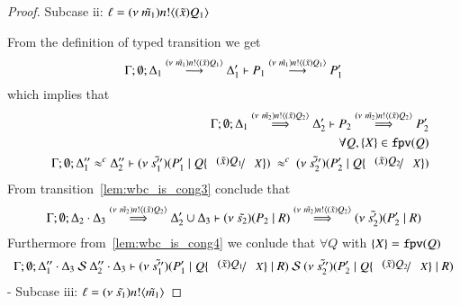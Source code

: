 \begin{proof}
	\noi Subcase ii: $\ell = (\nu\ \tilde{m_1}) n ! \langle (\tilde{x})Q_1 \rangle$

	\noi From the definition of typed transition we get
	\[
		\Gamma; \emptyset; \Delta_1 \stackrel{(\nu\ \tilde{m_1}) n ! \langle (\tilde{x})Q_1 \rangle}{\longrightarrow} \Delta_1' \vdash P_1 \stackrel{(\nu\ \tilde{m_1}) n ! \langle (\tilde{x})Q_1 \rangle}{\longrightarrow} P_1'
	\]
	\noi which implies that
%
	\begin{eqnarray}
		&&\Gamma; \emptyset; \Delta_1 \By{\news{\tilde{m_2}} \bactout{n}{\abs{\tilde{x}}{Q_2}}} \Delta_2' \proves P_2 \By{\news{\tilde{m_2}} \bactout{n}{\abs{\tilde{x}}{Q_2}}} P_2' \label{lem:wbc_is_cong3} \\
		&&\forall Q, \set{X} \in \fpv{Q} \nonumber \\
		&&\Gamma; \emptyset; \Delta_1'' \wbc \Delta_2'' \proves \newsp{\tilde{s_1''}}{P_1' \Par Q \subst{(\tilde{x}) Q_1}{X}}\ \wbc\ \newsp{\tilde{s_2''}}{P_2' \Par Q \subst{(\tilde{x}) Q_2}{X}} \label{lem:wbc_is_cong4}
	\end{eqnarray}
%
	\noi From transition~\ref{lem:wbc_is_cong3} conclude that 
	\[
		\Gamma;\emptyset; \Delta_2 \cdot \Delta_3 \stackrel{(\nu\ \tilde{m_2}) n ! \langle (\tilde{x})Q_2 \rangle}{\Longrightarrow} \Delta_2' \cup \Delta_3 \vdash (\nu\ \tilde{s_2})(P_2 \;|\; R) \stackrel{(\nu\ \tilde{m_2}) n ! \langle (\tilde{x})Q_2 \rangle}{\Longrightarrow} (\nu\ \tilde{s_2'})(P_2' \;|\; R)
	\]
%
	\noi Furthermore from~\ref{lem:wbc_is_cong4} we conlude that $\forall Q$ with $\{X\} = \mathtt{fpv}(Q)$
%
	\[
		\Gamma; \emptyset; \Delta_1'' \cat \Delta_3\ \mathcal{S}\ \Delta_2'' \cat \Delta_3 \proves \newsp{\tilde{s_1''}}{P_1' \Par Q \subst{(\tilde{x}) Q_1}{X} \Par R}\ \mathcal{S}\ \newsp{\tilde{s_2''}}{P_2' \Par Q \subst{(\tilde{x}) Q_2}{X} \Par R}
	\]
%
	- Subcase iii: $\ell = (\nu\ \tilde{s_1}) n ! \langle \tilde{m_1} \rangle$


\end{proof}
